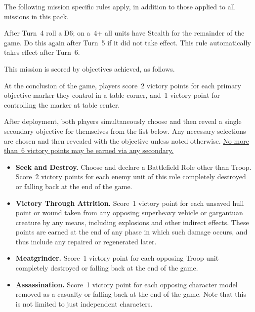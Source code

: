 \documentclass{40k}
\begin{document}
The following mission specific rules apply, in addition to those
applied to all missions in this pack.

  After Turn~4 roll a D6; on a~4+
all units have Stealth for the remainder of the game.  Do this again
after Turn~5 if it did not take effect.  This rule automatically takes
effect after Turn~6.



This mission is scored by objectives achieved, as follows.

 At the conclusion of the game,
players score~2 victory points for each primary objective marker they
control in a table corner, and~1 victory point for controlling the
marker at table center.




After deployment, both players simultaneously choose and then reveal a
single secondary objective for themselves from the list below.  Any
necessary selections are chosen and then revealed with the objective
unless noted otherwise.  \underline{No more than~6 victory points may
  be earned via any secondary.}

\begin{itemize}
\item \textbf{Seek and Destroy.}  Choose and declare a Battlefield
  Role other than Troop.  Score~2 victory points for each enemy unit
  of this role completely destroyed or falling back at the end of the
  game.

\item \textbf{Victory Through Attrition.}  Score~1 victory point for
  each unsaved hull point or wound taken from any opposing superheavy
  vehicle or gargantuan creature by any means, including explosions
  and other indirect effects.  These points are earned at the end of
  any phase in which such damage occurs, and thus include any repaired
  or regenerated later.

\item \textbf{Meatgrinder.}  Score~1 victory point for each opposing
  Troop unit completely destroyed or falling back at the end of the
  game.

\item \textbf{Assassination.}  Score~1 victory point for each opposing
  character model removed as a casualty or falling back at the end of
  the game.  Note that this is not limited to just independent
  characters.

\end{itemize}
\end{document}
